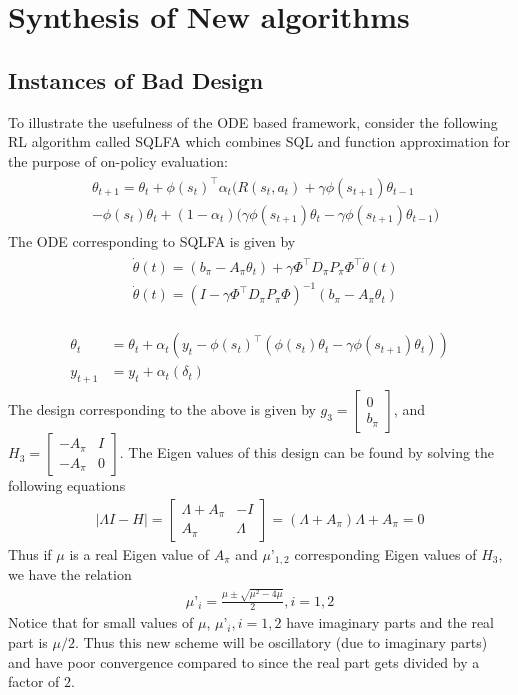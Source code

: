 \section{Synthesis of New algorithms}
\subsection{Instances of Bad Design}
To illustrate the usefulness of the ODE based framework, consider the following RL algorithm called SQLFA which combines SQL and function approximation for the purpose of on-policy evaluation:
\begin{align}\label{sqlfa}
\begin{split}
&\theta_{t+1}=\theta_t+\phi(s_t)^\top \alpha_t\big(R(s_t,a_t)+\gamma \phi(s_{t+1})\theta_{t-1}\\&-\phi(s_t)\theta_t +(1-\alpha_t)(\gamma \phi(s_{t+1})\theta_t-\gamma \phi(s_{t+1})\theta_{t-1}\big)
\end{split}
\end{align}
The ODE corresponding to SQLFA is given by
\begin{align}
\begin{split}
&\dot{\theta}(t)=(b_\pi-A_\pi\theta_t)+\gamma\Phi^\top D_\pi P_\pi\Phi^\top\dot{\theta}(t)\\
&\dot{\theta}(t)=(I-\gamma\Phi^\top D_\pi P_\pi\Phi)^{-1}(b_\pi-A_\pi\theta_t)
\end{split}
\end{align}

\begin{align}
\begin{split}
\theta_t&=\theta_t+\alpha_t(y_t-\phi(s_t)^\top(\phi(s_t)\theta_t-\gamma \phi(s_{t+1})\theta_t))\\
y_{t+1}&=y_{t}+\alpha_t(\delta_t)
\end{split}
\end{align}
The design corresponding to the above is given by $g_3=\begin{bmatrix}0\\ b_\pi\end{bmatrix}$, and $H_3=\begin{bmatrix} -A_\pi & I \\ -A_\pi & 0\end{bmatrix}$. The Eigen values of this design can be found by solving the following equations
\begin{align}
|\Lambda I-H|=\begin{bmatrix} \Lambda+A_\pi & -I \\ A_\pi & \Lambda\end{bmatrix}=(\Lambda+A_\pi)\Lambda+A_\pi=0
\end{align}
Thus if $\mu$ is a real Eigen value of $A_\pi$ and $\mu’_{1,2}$ corresponding Eigen values of $H_3$, we have the relation
\begin{align}
\mu’_{i}=\frac{\mu\pm\sqrt{\mu^2-4\mu}}{2}, i=1,2
\end{align}
Notice that for small values of $\mu$, $\mu’_i, i=1,2$ have imaginary parts and the real part is $\mu/2$. Thus this new scheme will be oscillatory (due to imaginary parts) and have poor convergence compared to \tdo since the real part gets divided by a factor of $2$.
